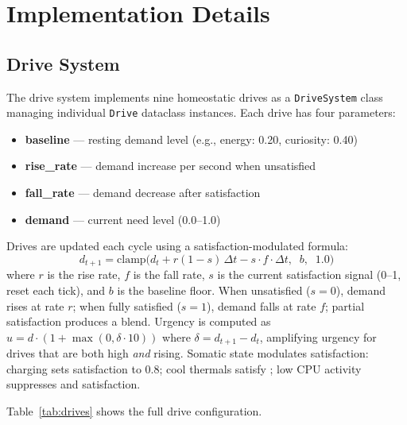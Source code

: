 \documentclass[11pt,oneside]{article}
\begin{document}
\section{Implementation Details}
\label{sec:implementation}

\subsection{Drive System}

The drive system implements nine homeostatic drives as a \texttt{DriveSystem} class managing individual \texttt{Drive} dataclass instances.
Each drive has four parameters:

\begin{itemize}
  \item \textbf{baseline} --- resting demand level (e.g., energy: 0.20, curiosity: 0.40)
  \item \textbf{rise\_rate} --- demand increase per second when unsatisfied
  \item \textbf{fall\_rate} --- demand decrease after satisfaction
  \item \textbf{demand} --- current need level (0.0--1.0)
\end{itemize}

Drives are updated each cycle using a satisfaction-modulated formula:
\[
d_{t+1} = \text{clamp}\!\Big(d_t + r(1 - s)\,\Delta t - s \cdot f \cdot \Delta t,\;\; b,\;\; 1.0\Big)
\]
where $r$ is the rise rate, $f$ is the fall rate, $s$ is the current satisfaction signal (0--1, reset each tick), and $b$ is the baseline floor.
When unsatisfied ($s=0$), demand rises at rate $r$; when fully satisfied ($s=1$), demand falls at rate $f$; partial satisfaction produces a blend.
Urgency is computed as $u = d \cdot (1 + \max(0, \delta \cdot 10))$ where $\delta = d_{t+1} - d_t$, amplifying urgency for drives that are both high \emph{and} rising.
Somatic state modulates satisfaction: charging sets  satisfaction to 0.8; cool thermals satisfy ; low CPU activity suppresses  and  satisfaction.

Table~\ref{tab:drives} shows the full drive configuration.
\end{document}

